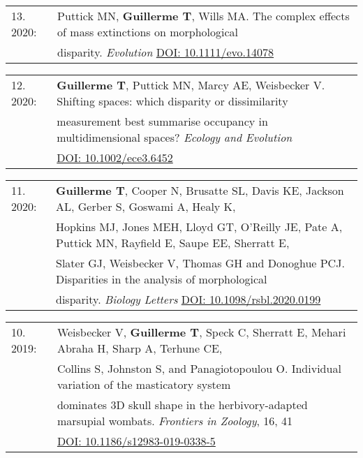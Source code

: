 \documentclass[10pt,a4paper]{article}
\begin{document}
{\begin{tabular}{ll}
13. 2020: & Puttick MN, \textbf{Guillerme T}, Wills MA. The complex effects of mass extinctions on morphological\\
          & disparity. \textit{Evolution} \href{https://onlinelibrary.wiley.com/doi/abs/10.1111/evo.14078}{DOI: 10.1111/evo.14078}\\
\end{tabular}
\bigskip

\begin{tabular}{ll}
12. 2020: & \textbf{Guillerme T}, Puttick MN, Marcy AE, Weisbecker V. Shifting spaces: which disparity or dissimilarity\\
      & measurement best summarise occupancy in multidimensional spaces? \textit{Ecology and Evolution}\\
      & \href{https://onlinelibrary.wiley.com/doi/full/10.1002/ece3.6452}{DOI: 10.1002/ece3.6452}\\
\end{tabular}
\bigskip

\begin{tabular}{ll}
11. 2020: & \textbf{Guillerme T}, Cooper N, Brusatte SL, Davis KE, Jackson AL, Gerber S, Goswami A, Healy K,\\
      & Hopkins MJ, Jones MEH, Lloyd GT, O’Reilly JE, Pate A, Puttick MN, Rayfield E, Saupe EE, Sherratt E,\\
      & Slater GJ, Weisbecker V, Thomas GH and Donoghue PCJ. Disparities in the analysis of morphological\\
      & disparity. \textit{Biology Letters} \href{https://royalsocietypublishing.org/doi/10.1098/rsbl.2020.0199}{DOI: 10.1098/rsbl.2020.0199}\\
\end{tabular}
\bigskip

\begin{tabular}{ll}
10. 2019: & Weisbecker V, \textbf{Guillerme T}, Speck C, Sherratt E, Mehari Abraha H, Sharp A, Terhune CE, \\
      & Collins S, Johnston S, and Panagiotopoulou O. Individual variation of the masticatory system \\
      & dominates 3D skull shape in the herbivory-adapted marsupial wombats. \textit{Frontiers in Zoology}, 16, 41\\
      & \href{https://frontiersinzoology.biomedcentral.com/articles/10.1186/s12983-019-0338-5}{DOI: 10.1186/s12983-019-0338-5}\\
\end{tabular}
\bigskip

}
\end{document}
